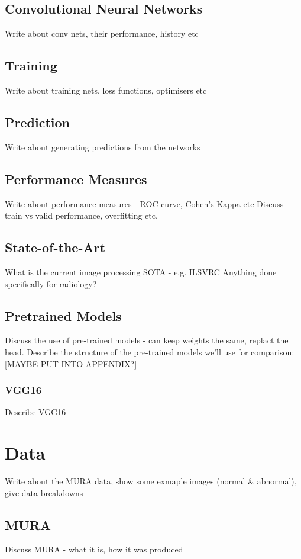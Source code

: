 \documentclass[11pt]{article} %
\theoremstyle{plain}
\theoremstyle{definition}
\begin{document}
\subsection{Convolutional Neural Networks}
Write about conv nets, their performance, history etc

\subsection{Training}
Write about training nets, loss functions, optimisers etc

\subsection{Prediction}
Write about generating predictions from the networks

\subsection{Performance Measures}
Write about performance measures - ROC curve, Cohen's Kappa etc
Discuss train vs valid performance, overfitting etc.

\subsection{State-of-the-Art}
What is the current image processing SOTA - e.g. ILSVRC
Anything done specifically for radiology?

\subsection{Pretrained Models}
Discuss the use of pre-trained models - can keep weights the same, replact the head.
Describe the structure of the pre-trained models we'll use for comparison:
[MAYBE PUT INTO APPENDIX?] 
\subsubsection{VGG16}
Describe VGG16 \\



\newpage
\section{Data}
Write about the MURA data, show some exmaple images (normal \& abnormal), give data breakdowns 

\subsection{MURA}
Discuss MURA - what it is, how it was produced
\end{document}
